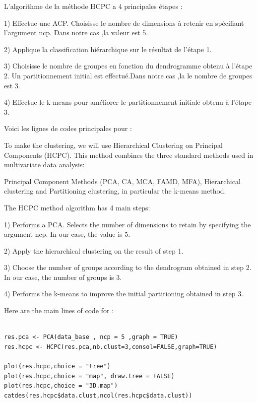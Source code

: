 \documentclass[12pt]{article}
\begin{document}
L'algorithme de la méthode HCPC a 4 principales étapes :

1) Effectue une ACP. Choisisse le nombre de dimensions à retenir en spécifiant l’argument ncp. Dans notre cas ,la  valeur est 5.

2) Applique la classification hiérarchique sur le résultat de l’étape 1.

3) Choisisse le nombre de groupes en fonction du dendrogramme obtenu à l’étape 2. Un partitionnement initial est effectué.Dans notre cas ,la  le nombre de groupes est 3.

4) Effectue le k-means pour améliorer le partitionnement initiale obtenu à l’étape 3.


Voici les lignes de codes principales pour :



To make the clustering, we will use Hierarchical Clustering on Principal Components (HCPC).
This method combines the three standard methods used in multivariate data analysis:

Principal Component Methods (PCA, CA, MCA, FAMD, MFA),
Hierarchical clustering and
Partitioning clustering, in particular the k-means method.


The HCPC method algorithm has 4 main steps:

1) Performs a PCA. Selects the number of dimensions to retain by specifying the argument ncp. In our case, the value is 5.

2) Apply the hierarchical clustering on the result of step 1.

3) Choose the number of groups according to the dendrogram obtained in step 2. In our case, the number of groups is 3.

4) Performs the k-means to improve the initial partitioning obtained in step 3.

Here are the main lines of code for :

\begin{lstlisting}

res.pca <- PCA(data_base , ncp = 5 ,graph = TRUE)
res.hcpc <- HCPC(res.pca,nb.clust=3,consol=FALSE,graph=TRUE)

plot(res.hcpc,choice = "tree")
plot(res.hcpc,choice = "map", draw.tree = FALSE)
plot(res.hcpc,choice = "3D.map")
catdes(res.hcpc$data.clust,ncol(res.hcpc$data.clust))

\end{lstlisting}
\end{document}
